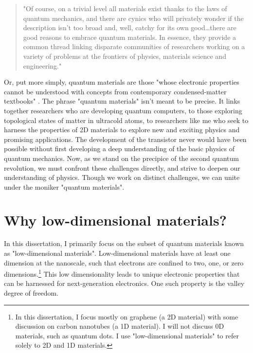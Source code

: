 \documentclass[double,12pt,1in]{beavtex}
\begin{document}
\begin{quote}
"Of course, on a trivial level all materials
exist thanks to the laws of quantum
mechanics, and there are cynics who will
privately wonder if the description isn’t too
broad and, well, catchy for its own good\dots there
are good reasons to embrace quantum
materials. In essence, they provide
a common thread linking disparate
communities of researchers working on
a variety of problems at the frontiers of
physics, materials science and engineering." \cite{noauthor_rise_2016}
\end{quote}
Or, put more simply, quantum materials are those "whose electronic properties cannot be understood with concepts from contemporary condensed-matter textbooks" \cite{orenstein_ultrafast_2012}. The phrase "quantum materials" isn't meant to be precise. It links together researchers who are developing quantum computers, to those exploring topological states of matter in ultracold atoms, to researchers like me who seek to harness the properties of 2D materials to explore new and exciting physics and promising applications. The development of the transistor never would have been possible without first developing a deep understanding of the basic physics of quantum mechanics. Now, as we stand on the precipice of the second quantum revolution, we must confront these challenges directly, and strive to deepen our understanding of physics. Though we work on distinct challenges, we can unite under the moniker "quantum materials". 



\section{Why low-dimensional materials?}
In this dissertation, I primarily focus on the subset of quantum materials known as "low-dimensional materials". Low-dimensional materials have at least one dimension at the nanoscale, such that electrons are confined to two, one, or zero dimensions.\footnote{In this dissertation, I focus mostly on graphene (a 2D material) with some discussion on carbon nanotubes (a 1D material). I will not discuss 0D materials, such as quantum dots. I use "low-dimensional materials" to refer solely to 2D and 1D materials.} This low dimensionality leads to unique electronic properties that can be harnessed for next-generation electronics. One such property is the valley degree of freedom.
\end{document}
